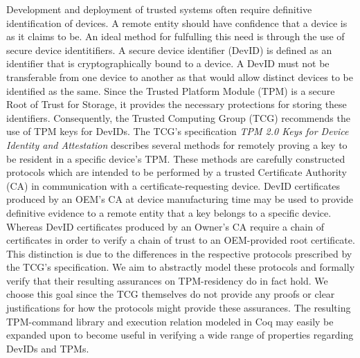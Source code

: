 \begin{abstractlong}

Development and deployment of trusted systems often require definitive identification of devices. A remote entity should have confidence that a device is as it claims to be. An ideal method for fulfulling this need is through the use of secure device identitifiers. A secure device identifier (DevID) is defined as an identifier that is cryptographically bound to a device. A DevID must not be transferable from one device to another as that would allow distinct devices to be identified as the same. Since the Trusted Platform Module (TPM) is a secure Root of Trust for Storage, it provides the necessary protections for storing these identifiers. Consequently, the Trusted Computing Group (TCG) recommends the use of TPM keys for DevIDs. 
The TCG's specification \textit{TPM 2.0 Keys for Device Identity and Attestation} describes several methods for remotely proving a key to be resident in a specific device's TPM. These methods are carefully constructed protocols which are intended to be performed by a trusted Certificate Authority (CA) in communication with a certificate-requesting device. DevID certificates produced by an OEM's CA at device manufacturing time may be used to provide definitive evidence to a remote entity that a key belongs to a specific device. Whereas DevID certificates produced by an Owner's CA require a chain of certificates in order to verify a chain of trust to an OEM-provided root certificate. This distinction is due to the differences in the respective protocols prescribed by the TCG's specification. We aim to abstractly model these protocols and formally verify that their resulting assurances on TPM-residency do in fact hold. We choose this goal since the TCG themselves do not provide any proofs or clear justifications for how the protocols might provide these assurances. The resulting TPM-command library and execution relation modeled in Coq may easily be expanded upon to become useful in verifying a wide range of properties regarding DevIDs and TPMs.

\end{abstractlong}




\begin{acknowledgementslong}

\end{acknowledgementslong}

